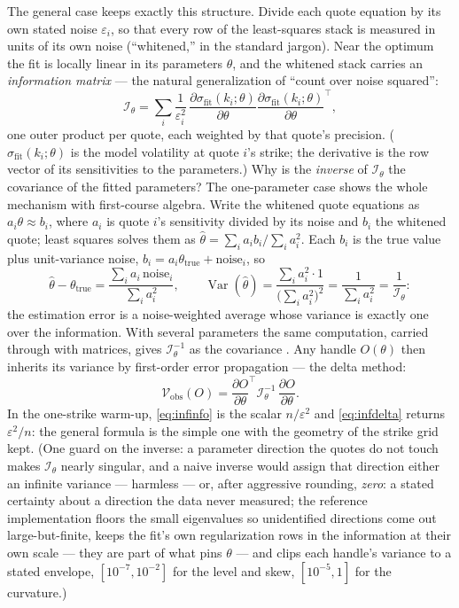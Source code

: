 The general case keeps exactly this structure.  Divide each quote
equation by its own stated noise $\varepsilon_i$, so that every row
of the least-squares stack is measured in units of its own noise
(``whitened,'' in the standard jargon).  Near the optimum the fit is
locally linear in its parameters $\theta$, and the whitened stack
carries an \emph{information matrix} --- the natural generalization
of ``count over noise squared'':
\begin{equation}
\mathcal{I}_\theta
=\sum_i\frac{1}{\varepsilon_i^2}\,
\frac{\partial\sigma_{\mathrm{fit}}(k_i;\theta)}{\partial\theta}
\frac{\partial\sigma_{\mathrm{fit}}(k_i;\theta)}{\partial\theta}
^{\!\top},
\label{eq:infinfo}
\end{equation}
one outer product per quote, each weighted by that quote's
precision.  ($\sigma_{\mathrm{fit}}(k_i;\theta)$ is the model
volatility at quote $i$'s strike; the derivative is the row vector
of its sensitivities to the parameters.)  Why is the \emph{inverse}
of $\mathcal{I}_\theta$ the covariance of the fitted parameters?
The one-parameter case shows the whole mechanism with first-course
algebra.  Write the whitened quote equations as
$a_i\theta\approx b_i$, where $a_i$ is quote $i$'s sensitivity
divided by its noise and $b_i$ the whitened quote; least squares
solves them as $\hat\theta=\sum_ia_ib_i\big/\sum_ia_i^2$.  Each
$b_i$ is the true value plus unit-variance noise,
$b_i=a_i\theta_{\mathrm{true}}+\text{noise}_i$, so
\[
\hat\theta-\theta_{\mathrm{true}}
=\frac{\sum_ia_i\,\text{noise}_i}{\sum_ia_i^2},
\qquad
\operatorname{Var}(\hat\theta)
=\frac{\sum_ia_i^2\cdot1}{\bigl(\sum_ia_i^2\bigr)^2}
=\frac{1}{\sum_ia_i^2}
=\frac{1}{\mathcal{I}_\theta}:
\]
the estimation error is a noise-weighted average whose variance is
exactly one over the information.  With several parameters the same
computation, carried through with matrices, gives
$\mathcal{I}_\theta^{-1}$ as the covariance
\citep{SeberLee2003}.  Any handle $O(\theta)$ then inherits its
variance by first-order error propagation --- the delta method:
\begin{equation}
\mathcal{V}_{\mathrm{obs}}(O)
=\frac{\partial O}{\partial\theta}^{\!\top}
\mathcal{I}_\theta^{-1}\,
\frac{\partial O}{\partial\theta}.
\label{eq:infdelta}
\end{equation}
In the one-strike warm-up, \cref{eq:infinfo} is the scalar
$n/\varepsilon^2$ and \cref{eq:infdelta} returns
$\varepsilon^2/n$: the general formula is the simple one with the
geometry of the strike grid kept.  (One guard on the inverse: a
parameter direction the quotes do not touch makes
$\mathcal{I}_\theta$ nearly singular, and a naive inverse would
assign that direction either an infinite variance --- harmless ---
or, after aggressive rounding, \emph{zero}: a stated certainty
about a direction the data never measured; the reference
implementation floors the small eigenvalues so unidentified
directions come out large-but-finite, keeps the fit's own
regularization rows in the information at their own scale --- they
are part of what pins $\theta$ --- and clips each handle's variance
to a stated envelope, $[10^{-7},10^{-2}]$ for the level and skew,
$[10^{-5},1]$ for the curvature.)

